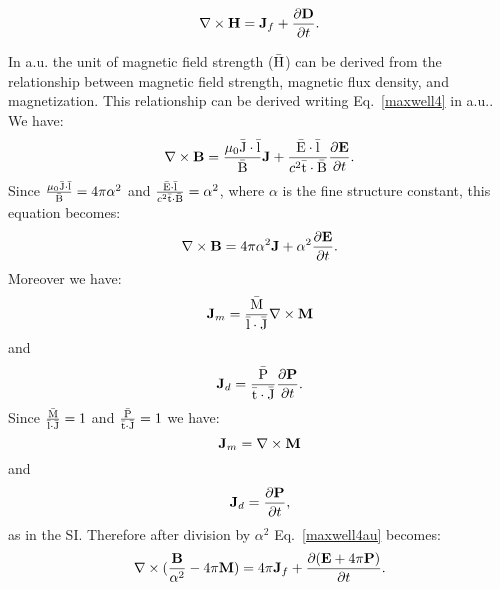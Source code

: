 \documentclass[12pt,a4paper,twoside]{report}
\begin{document}
{\begin{tcolorbox}
\begin{equation}
\nabla \times {\bf H}= {\bf J}_f + 
{\partial {\bf D}\over
\partial t}.
\end{equation}
\end{tcolorbox}

{\color{web-blue} In a.u. the unit of magnetic field strength (${\rm \bar H}$) 
can be derived from the relationship between magnetic field strength,
magnetic flux density, and magnetization. This relationship can
be derived writing Eq.~\ref{maxwell4} in a.u..
We have:
\begin{equation}
\nabla \times {\bf B}= {\mu_0 {\rm \bar J}\cdot {\rm \bar l} \over {\rm \bar B}} {\bf J} + 
{{\rm \bar E}\cdot {\rm \bar l} \over c^2 {\rm \bar t}\cdot {\rm \bar B}} {\partial {\bf E} \over
\partial t}.
\label{maxwell4gen}
\end{equation}
Since ${\mu_0 {\rm \bar J}\cdot {\rm \bar l} \over {\rm \bar B}}=4 \pi \alpha^2$ and 
${{\rm \bar E}\cdot {\rm \bar l} \over c^2 {\rm \bar t}\cdot {\rm \bar B}}=\alpha^2$, where $\alpha$ 
is the fine structure constant, this equation becomes:
\begin{equation}
\nabla \times {\bf B}= {4 \pi \alpha^2} {\bf J} + {\alpha^2} 
{\partial {\bf E} \over \partial t}.
\label{maxwell4au}
\end{equation}
Moreover we have:
\begin{equation}
{\bf J}_m={{\rm \bar M} \over {\rm \bar l}\cdot {\rm \bar J}} \nabla \times {\bf M}
\end{equation}
and 
\begin{equation}
{\bf J}_d={{\rm \bar P} \over {\rm \bar t} \cdot {\rm \bar J}} {\partial {\bf P} \over \partial t}.
\end{equation}
Since ${{\rm \bar M} \over {\rm \bar l}\cdot {\rm \bar J}}=1$ and 
${{\rm \bar P} \over {\rm \bar t}\cdot {\rm \bar J}}=1$ we have:
\begin{equation}
{\bf J}_m= \nabla \times {\bf M}
\end{equation}
and 
\begin{equation}
{\bf J}_d={\partial {\bf P} \over \partial t},
\end{equation}
as in the SI. Therefore after division by $\alpha^2$ 
Eq.~\ref{maxwell4au} becomes:
\begin{equation}
\nabla \times ({{\bf B}\over \alpha^2} -4\pi {\bf M})= 
{4 \pi} {\bf J}_f +  {\partial ({\bf E}+4\pi {\bf P}) \over \partial t}.
\label{maxwell4au1}
\end{equation}
}}
\end{document}
